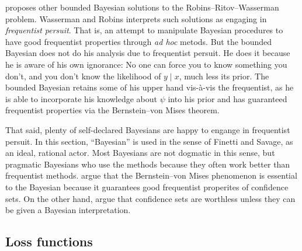 \textcite{Sims2012-ze} proposes other bounded Bayesian solutions
to the Robins--Ritov--Wasserman problem. Wasserman and Robins interprets
such solutions as engaging in \emph{frequentist persuit}. That is,
an attempt to manipulate Bayesian procedures to have good frequentist
properties through \emph{ad hoc} metods. But the bounded Bayesian
does not do his analysis due to frequentist persuit. He does it because
he is aware of his own ignorance: No one can force you to know something
you don't, and you don't know the likelihood of $y\mid x$, much less
its prior. The bounded Bayesian retains some of his upper hand vis-à-vis
the frequentist, as he is able to incorporate his knowledge about
$\psi$ into his prior and has guaranteed frequentist properties via
the Bernstein--von Mises theorem.

That said, plenty of self-declared Bayesians are happy to engange
in frequentist persuit. In this section, ``Bayesian'' is used in
the sense of Finetti and Savage, as an ideal, rational actor. Most
Bayesians are not dogmatic in this sense, but pragmatic Bayesians
who use the methods because they often work better than frequentist
methods. \textcite{Gelman2013-ib} argue that the Bernstein--von Mises
phenomenon is essential to the Bayesian because it guarantees good
frequentist properites of confidence sets. On the other hand, \textcite{Morey2016-ry}
argue that confidence sets are worthless unless they can be given
a Bayesian interpretation. 

\subsection{Loss functions}

